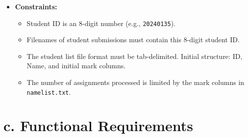 \documentclass[11pt, a4paper]{article}
\begin{document}
\begin{itemize}[leftmargin=*]
    \item \textbf{Constraints:}
    \begin{itemize}
        \item Student ID is an 8-digit number (e.g., \texttt{20240135}).
        \item Filenames of student submissions must contain this 8-digit student ID.
        \item The student list file format must be tab-delimited. Initial structure: ID, Name, and initial mark columns.
        \item The number of assignments processed is limited by the mark columns in \texttt{namelist.txt}.
    \end{itemize}
\end{itemize}

\section*{c. Functional Requirements}
\end{document}
